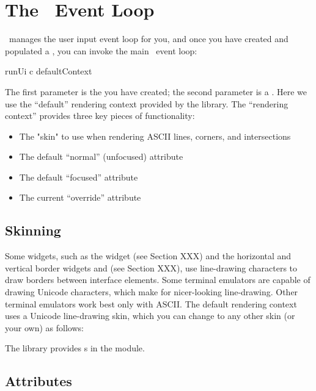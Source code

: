 \section{The \vtyui\ Event Loop}
\label{sec:event_loop}

\vtyui\ manages the user input event loop for you, and once you have
created and populated a , you can invoke the main
\vtyui\ event loop:

\begin{haskellcode}
 runUi c defaultContext
\end{haskellcode}

The first parameter is the  you have created; the
second parameter is a .  Here we use the ``default''
rendering context provided by the library.  The ``rendering context''
provides three key pieces of functionality:

\begin{itemize}
\item The "skin" to use when rendering ASCII lines, corners, and
      intersections
\item The default ``normal'' (unfocused) attribute
\item The default ``focused'' attribute
\item The current ``override'' attribute
\end{itemize}

\subsection{Skinning}
\label{sec:skinning}

Some widgets, such as the  widget (see Section XXX) and the
horizontal and vertical border widgets  and 
(see Section XXX), use line-drawing characters to draw borders between
interface elements.  Some terminal emulators are capable of drawing
Unicode characters, which make for nicer-looking line-drawing.  Other
terminal emulators work best only with ASCII.  The default rendering
context uses a Unicode line-drawing skin, which you can change to any
other skin (or your own) as follows:


The library provides s in the  module.

\subsection{Attributes}
\label{sec:attributes}

